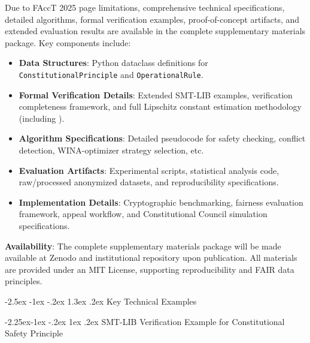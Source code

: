 \documentclass[manuscript,screen,9pt]{acmart}
\makeatletter
\renewcommand\section{\@startsection{section}{1}{\z@}%
  {-2.5ex \@plus -1ex \@minus -.2ex}%
  {1.3ex \@plus.2ex}%
  {\normalfont\Large\bfseries}}
\renewcommand\subsection{\@startsection{subsection}{2}{\z@}%
  {-2.25ex\@plus -1ex \@minus -.2ex}%
  {1ex \@plus .2ex}%
  {\normalfont\large\bfseries}}
\makeatother
\begin{document}
\begin{table}[!htb]
Due to FAccT 2025 page limitations, comprehensive technical specifications, detailed algorithms, formal verification examples, proof-of-concept artifacts, and extended evaluation results are available in the complete supplementary materials package. Key components include:
\begin{itemize}[leftmargin=*,itemsep=1pt,parsep=1pt]
    \item \textbf{Data Structures}: Python dataclass definitions for \texttt{ConstitutionalPrinciple} and \texttt{OperationalRule}.
    \item \textbf{Formal Verification Details}: Extended SMT-LIB examples, verification completeness framework, and full Lipschitz constant estimation methodology (including ).
    \item \textbf{Algorithm Specifications}: Detailed pseudocode for safety checking, conflict detection, WINA-optimizer strategy selection, etc.
    \item \textbf{Evaluation Artifacts}: Experimental scripts, statistical analysis code, raw/processed anonymized datasets, and reproducibility specifications.
    \item \textbf{Implementation Details}: Cryptographic benchmarking, fairness evaluation framework, appeal workflow, and Constitutional Council simulation specifications.
\end{itemize}
\textbf{Availability}: The complete supplementary materials package will be made available at Zenodo and institutional repository upon publication. All materials are provided under an MIT License, supporting reproducibility and FAIR data principles.

\section{Key Technical Examples}
\label{app:key_examples}

\subsection{SMT-LIB Verification Example for Constitutional Safety Principle}
\label{subsubsec:smtlib_verification_example}


\end{table}
\end{document}
